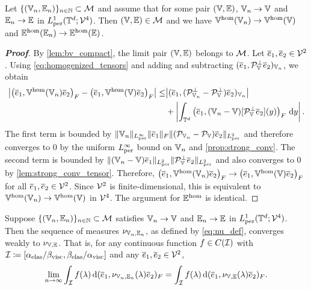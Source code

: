 \begin{corollary}\label{cor:continuity_tensors}
Let $\{(\mathbb{V}_n,\mathbb{E}_n)\}_{n\in\mathbb{N}}\subset{\mathcal{M}}$ and assume that for some pair $(\mathbb{V},\mathbb{E})$, $\mathbb{V}_n\to\mathbb{V}$ and $\mathbb{E}_n\to\mathbb{E}$ in $L^1_{\rm per}(\mathbb{T}^d;{\mathcal{V}}^4)${.} Then $(\mathbb{V},\mathbb{E})\in{\mathcal{M}}$ and we have $\mathbb{V}^{\mathrm{hom}}(\mathbb{V}_n)\to \mathbb{V}^{\mathrm{hom}}(\mathbb{V})$ and $\mathbb{E}^{\mathrm{hom}}(\mathbb{E}_n)\to \mathbb{E}^{\mathrm{hom}}(\mathbb{E})$.
\end{corollary}

\begin{proof}[\bf Proof]
By \cref{lem:bv_compact}, the limit pair $(\mathbb{V},\mathbb{E})$ belongs to ${\mathcal{M}}$. Let $\overline e_1,\overline e_2\in{\mathcal{V}}^2$. Using \cref{eq:homogenized_tensors} and adding and subtracting $(\overline{e}_1,{\mathcal{P}}_{\mathbb{V}}^{\perp}\overline e_2)_{\mathbb{V}_n}$, we obtain
\begin{align*}
    \bigl| \left(\overline e_1, \mathbb{V}^{\mathrm{hom}}(\mathbb{V}_n)\overline{e}_2\right)_F-\left(\overline e_1,\mathbb{V}^{\mathrm{hom}}(\mathbb{V})\overline e_2\right)_F\bigr|\le &\bigl|(\overline e_1,({\mathcal{P}}_{\mathbb{V}_n}^{\perp}-{\mathcal{P}}_{\mathbb{V}}^{\perp})\overline e_2)_{\mathbb{V}_n}\bigr|\\
    &+\left|\int_{\mathbb{T}^d}\left(\overline e_1,(\mathbb{V}_n-\mathbb{V})[{\mathcal{P}}_{\mathbb{V}}^{\perp}\overline e_2](y)\right)_F \,\mathrm{d}y\right|.
\end{align*}
The first term is bounded by $\|\mathbb{V}_n\|_{L^\infty_{\rm per}}\|\overline e_1\|_F\|({\mathcal{P}}_{\mathbb{V}_n}-{\mathcal{P}}_{\mathbb{V}})\overline e_2\|_{L^2_{\rm per}}$ and therefore converges to $0$ by the uniform $L^\infty_{\rm per}$ bound on $\mathbb{V}_n$ and \cref{prop:strong_conv}. The second term is bounded by $\|(\mathbb{V}_n-\mathbb{V})\overline e_1\|_{L^2_{\rm per}}\|{\mathcal{P}}_{\mathbb{V}}^{\perp}\overline e_2\|_{L^2_{\rm per}}$ and also converges to $0$ by \cref{lem:strong_conv_tensor}. Therefore, $\left(\overline e_1,\mathbb{V}^{\mathrm{hom}}(\mathbb{V}_n)\overline e_2\right)_F\to {\left(\overline e_1,\mathbb{V}^{\mathrm{hom}}(\mathbb{V})\overline e_2\right)_F}$ for all $\overline e_1,\overline e_2\in{\mathcal{V}}^2$. Since ${\mathcal{V}}^2$ is finite-dimensional, this is equivalent to $\mathbb{V}^{\mathrm{hom}}(\mathbb{V}_n)\to \mathbb{V}^{\mathrm{hom}}(\mathbb{V})$ in ${\mathcal{V}}^4$. The argument for $\mathbb{E}^{\mathrm{hom}}$ is identical.
\end{proof}

\begin{lemma}
\label{lem:weak_convergence}
Suppose $\{(\mathbb{V}_n,\mathbb{E}_n)\}_{n\in\mathbb{N}}\subset{\mathcal{M}}$ satisfies $\mathbb{V}_n\to\mathbb{V}$ and $\mathbb{E}_n\to\mathbb{E}$ in $L^1_{\mathrm{per}}(\mathbb{T}^d;{\mathcal{V}}^{4})$. Then the sequence of measures $\nu_{\mathbb{V}_n,\mathbb{E}_n}$, as defined by \cref{eq:nu_def}, converges weakly to $\nu_{\mathbb{V},\mathbb{E}}$. That is, for any continuous function $f \in C({\mathcal{I}})$ with ${\mathcal{I}}\coloneqq[\alpha_{\rm elas}/\beta_{\rm visc}, \beta_{\rm elas}/\alpha_{\rm visc}]$ and any $\overline{e}_1, \overline{e}_2 \in {\mathcal{V}}^{2}$,
\begin{equation*}
    \lim_{n \to \infty} \int_{{\mathcal{I}}} f(\lambda) \, \mathrm{d}(\overline{e}_1,\nu_{\mathbb{V}_n,\mathbb{E}_n}(\lambda)\overline{e}_2)_F = \int_{{\mathcal{I}}} f(\lambda) \, \mathrm{d}(\overline{e}_1,\nu_{\mathbb{V},\mathbb{E}}(\lambda)\overline{e}_2)_F.
\end{equation*}
\end{lemma}

